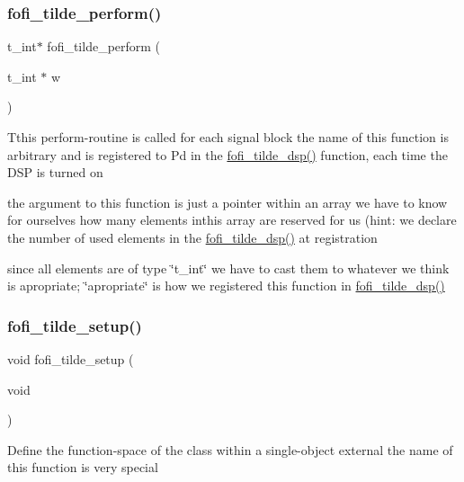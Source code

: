 \subsubsection{\texorpdfstring{fofi\_tilde\_perform()}{fofi\_tilde\_perform()}}
{\footnotesize\ttfamily t\+\_\+int$\ast$ fofi\+\_\+tilde\+\_\+perform (\begin{DoxyParamCaption}\item[{t\+\_\+int $\ast$}]{w }\end{DoxyParamCaption})}

Tthis perform-\/routine is called for each signal block the name of this function is arbitrary and is registered to Pd in the \mbox{\hyperlink{fofi~_8h_aff2a8eab6867563a3613be7a34908bb2}{fofi\+\_\+tilde\+\_\+dsp()}} function, each time the D\+SP is turned on

the argument to this function is just a pointer within an array we have to know for ourselves how many elements inthis array are reserved for us (hint\+: we declare the number of used elements in the \mbox{\hyperlink{fofi~_8h_aff2a8eab6867563a3613be7a34908bb2}{fofi\+\_\+tilde\+\_\+dsp()}} at registration

since all elements are of type \char`\"{}t\+\_\+int\char`\"{} we have to cast them to whatever we think is apropriate; \char`\"{}apropriate\char`\"{} is how we registered this function in \mbox{\hyperlink{fofi~_8h_aff2a8eab6867563a3613be7a34908bb2}{fofi\+\_\+tilde\+\_\+dsp()}} \mbox{\label{fofi~_8c_a7dd6882540d4beb229f7604500e7ef47}} 
\subsubsection{\texorpdfstring{fofi\_tilde\_setup()}{fofi\_tilde\_setup()}}
{\footnotesize\ttfamily void fofi\+\_\+tilde\+\_\+setup (\begin{DoxyParamCaption}\item[{void}]{ }\end{DoxyParamCaption})}

Define the function-\/space of the class within a single-\/object external the name of this function is very special \mbox{\label{fofi~_8c_aa9833aa2762cf257e25d13fb21b004b0}} 
